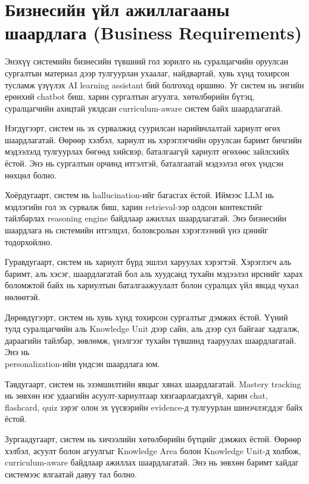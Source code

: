 \documentclass[12pt,A4]{report}
\newcommand{\eng}[1]{#1}
\begin{document}
\section{Бизнесийн үйл ажиллагааны шаардлага (Business Requirements)}

Энэхүү системийн бизнесийн түвшний гол зорилго нь суралцагчийн оруулсан \\сургалтын материал дээр тулгуурлан ухаалаг, найдвартай, хувь хүнд тохирсон тусламж үзүүлэх \eng{AI learning assistant} бий болгоход оршино. Уг систем нь энгийн ерөнхий \eng{chatbot} биш, харин сургалтын агуулга, хөтөлбөрийн бүтэц, суралцагчийн ахицтай уялдсан \eng{curriculum-aware} систем байх шаардлагатай.

Нэгдүгээрт, систем нь эх сурвалжид суурилсан нарийвчлалтай хариулт өгөх \\ шаардлагатай. Өөрөөр хэлбэл, хариулт нь хэрэглэгчийн оруулсан баримт бичгийн мэдээлэлд тулгуурлах бөгөөд хийсвэр, баталгаагүй хариулт өгөхөөс зайлсхийх ёстой. Энэ нь сургалтын орчинд итгэлтэй, баталгаатай мэдээлэл өгөх үндсэн нөхцөл болно.

Хоёрдугаарт, систем нь \eng{hallucination}-ийг багасгах ёстой. Иймээс \eng{LLM} нь мэдлэгийн гол эх сурвалж биш, харин retrieval-ээр олдсон контекстийг тайлбарлах \eng{reasoning engine} байдлаар ажиллах шаардлагатай. Энэ бизнесийн шаардлага нь системийн итгэлцэл, боловсролын хэрэглээний үнэ цэнийг тодорхойлно. 

Гуравдугаарт, систем нь хариулт бүрд эшлэл харуулах хэрэгтэй. Хэрэглэгч аль баримт, аль хэсэг, шаардлагатай бол аль хуудсанд тухайн мэдээлэл ирснийг харах боломжтой байх нь хариултын баталгаажуулалт болон суралцах үйл явцад чухал нөлөөтэй. 

Дөрөвдүгээрт, систем нь хувь хүнд тохирсон сургалтыг дэмжих ёстой. Үүний тулд суралцагчийн аль \eng{Knowledge Unit} дээр сайн, аль дээр сул байгааг хадгалж, дараагийн тайлбар, зөвлөмж, үнэлгээг тухайн түвшинд тааруулах шаардлагатай. Энэ нь\\ personalization-ийн үндсэн шаардлага юм. 

Тавдугаарт, систем нь эзэмшилтийн явцыг хянах шаардлагатай. \eng{Mastery tracking} нь зөвхөн нэг удаагийн асуулт-хариултаар хязгаарлагдахгүй, харин \eng{chat}, \eng{flashcard}, \eng{quiz} зэрэг олон эх үүсвэрийн \eng{evidence}-д тулгуурлан шинэчлэгддэг байх ёстой. 

Зургаадугаарт, систем нь хичээлийн хөтөлбөрийн бүтцийг дэмжих ёстой. Өөрөөр хэлбэл, асуулт болон агуулгыг \eng{Knowledge Area} болон \eng{Knowledge Unit}-д холбож, curriculum-aware байдлаар ажиллах шаардлагатай. Энэ нь зөвхөн баримт хайдаг системээс ялгаатай давуу тал болно. 
\end{document}
